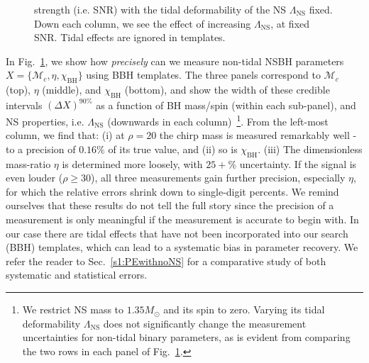 \documentclass[aps,prd,amsmath,floats,floatfix, twocolumn,
superscriptaddress,nofootinbib,showpacs]{revtex4-1}
\newcommand{\lambdans}{\Lambda_\mathrm{NS}}
\newcommand{\chibh}{\chi_\mathrm{BH}}
\newcommand{\mchirp}{\mathcal{M}_c}
\begin{document}
\begin{appendix}
\begin{figure}
{strength (i.e. SNR) with the tidal deformability of the NS $\lambdans$ fixed.
Down each column, we see the effect of increasing $\lambdans$, at fixed SNR.
Tidal effects are ignored in templates.
}
\label{fig:CIWidths90_Lambda_SNR}
\end{figure}
In Fig.~\ref{fig:CIWidths90_Lambda_SNR}, we show how {\it precisely} can we
measure non-tidal NSBH parameters $X=\{\mchirp,\eta,\chibh\}$ using BBH templates.
The three panels correspond to $\mchirp$ (top), $\eta$ (middle), and $\chibh$
(bottom), and show the width of these credible intervals $(\Delta X)^{90\%}$
as a function of BH mass/spin (within each sub-panel), and NS properties, i.e.
$\lambdans$ (downwards in each column)~\footnote{We restrict NS mass to
$1.35M_\odot$ and its spin to zero. Varying its tidal deformability $\lambdans$
does not significantly change the measurement uncertainties for non-tidal
binary parameters, as is evident from comparing the two rows in each panel of
Fig.~\ref{fig:CIWidths90_Lambda_SNR}.}.
% 
From the left-most column, we find that: (i) at $\rho=20$ the chirp mass is
measured remarkably well - to a precision of $0.16\%$ of its true value, and
(ii) so is $\chibh$. (iii) The dimensionless mass-ratio $\eta$ is determined
more loosely, with $25+\%$ uncertainty. If the signal is even louder
($\rho\geq 30$), all three measurements gain further precision, especially
$\eta$, for which the relative errors shrink down to single-digit percents.
We remind ourselves that these results do not tell the full story since the
precision of a measurement is only meaningful if the measurement is accurate 
to begin with. In our case there are tidal effects that have not been
incorporated into our search (BBH) templates, which can lead to a systematic
bias in parameter recovery. We refer the reader to Sec.~\ref{s1:PEwithnoNS} for
a comparative study of both systematic and statistical errors.





\end{appendix}
\end{document}
